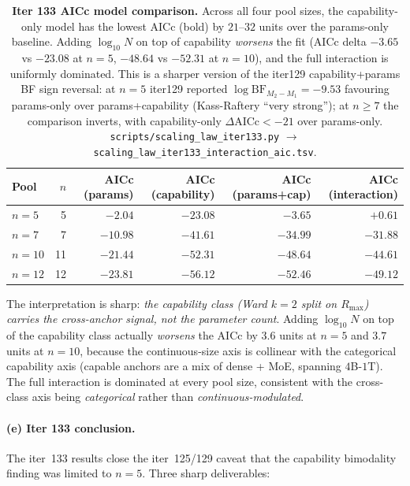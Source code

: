 \begin{table}[t]
  \centering
  \small
  \begin{tabular}{lrrrrr}
    \toprule
    Pool & $n$ & AICc (params) & AICc (capability) &
           AICc (params+cap) & AICc (interaction) \\
    \midrule
    $n=5$  &  5 & $-2.04$  & $\mathbf{-23.08}$ & $-3.65$  & $+0.61$ \\
    $n=7$  &  7 & $-10.98$ & $\mathbf{-41.61}$ & $-34.99$ & $-31.88$ \\
    $n=10$ & 11 & $-21.44$ & $\mathbf{-52.31}$ & $-48.64$ & $-44.61$ \\
    $n=12$ & 12 & $-23.81$ & $\mathbf{-56.12}$ & $-52.46$ & $-49.12$ \\
    \bottomrule
  \end{tabular}
  \caption{\textbf{Iter 133 AICc model comparison.}
    Across all four pool sizes, the capability-only model has the
    lowest AICc (bold) by $21$--$32$ units over the params-only
    baseline.  Adding $\log_{10} N$ on top of capability
    \emph{worsens} the fit (AICc delta $-3.65$ vs $-23.08$ at
    $n=5$, $-48.64$ vs $-52.31$ at $n=10$), and the full
    interaction is uniformly dominated.  This is a sharper
    version of the iter129 capability+params BF sign reversal:
    at $n=5$ iter129 reported $\log \mathrm{BF}_{M_2 - M_1} =
    -9.53$ favouring params-only over params+capability
    (Kass-Raftery ``very strong''); at $n \ge 7$ the comparison
    inverts, with capability-only $\Delta\text{AICc} < -21$
    over params-only.  \texttt{scripts/scaling\_law\_iter133.py}
    $\to$ \texttt{scaling\_law\_iter133\_interaction\_aic.tsv}.}
  \label{tab:scaling-iter133-aic}
\end{table}

The interpretation is sharp: \emph{the capability class (Ward
$k=2$ split on $R_{\max}$) carries the cross-anchor signal,
not the parameter count}.  Adding $\log_{10} N$ on top of the
capability class actually \emph{worsens} the AICc by $3.6$
units at $n=5$ and $3.7$ units at $n=10$, because the
continuous-size axis is collinear with the categorical
capability axis (capable anchors are a mix of dense + MoE,
spanning $4$B-$1$T).  The full interaction is dominated at
every pool size, consistent with the cross-class axis being
\emph{categorical} rather than \emph{continuous-modulated}.

\paragraph{(e) Iter 133 conclusion.}
\label{par:scaling-iter133-conclusion}
The iter~133 results close the iter~125/129 caveat that the
capability bimodality finding was limited to $n = 5$.  Three
sharp deliverables:

